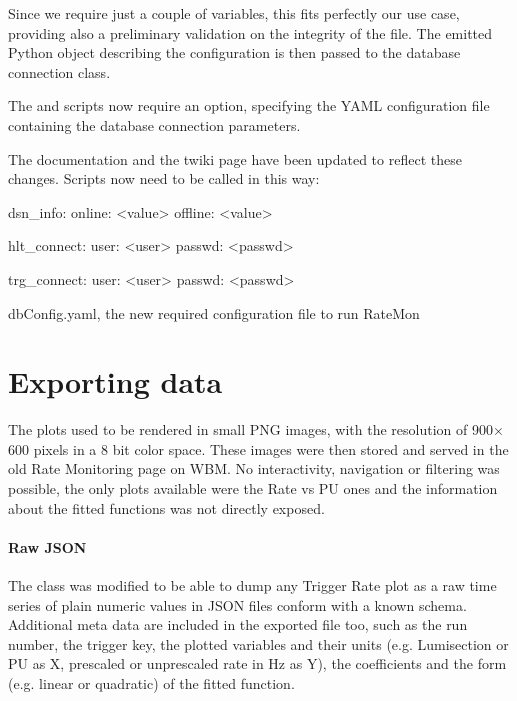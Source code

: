 Since we require just a couple of variables, this fits perfectly our use case, providing also a preliminary validation on the integrity of the file. The emitted Python object describing the configuration is then passed to the database connection class.

The  and  scripts now require an  option, specifying the YAML configuration file containing the database connection parameters.

The documentation and the twiki page have been updated to reflect these changes. Scripts now need to be called in this way:


\begin{listing}[ht]
\begin{yamlcode}
dsn_info:
    online: <value>
    offline: <value>

hlt_connect:
    user: <user>
    passwd: <passwd>

trg_connect:
    user: <user>
    passwd: <passwd>
\end{yamlcode}
\caption{dbConfig.yaml, the new required configuration file to run RateMon}
\end{listing}

\section{Exporting data}

The plots used to be rendered in small PNG images, with the resolution of 900$\times$600 pixels in a 8 bit color space. These images were then stored and served in the old Rate Monitoring page on WBM. No interactivity, navigation or filtering was possible, the only plots available were the Rate vs PU ones and the information about the fitted functions was not directly exposed.

\paragraph{Raw JSON}

The  class was modified \cite{RootexporttoggleJSONexportfunction6MergeRequestsCMSTSGFOGratemonGitLab-2020-10-07} to be able to dump any Trigger Rate plot as a raw time series of plain numeric values in JSON files conform with a known schema. Additional meta data are included in the exported file too, such as the run number, the trigger key, the plotted variables and their units (e.g. Lumisection or PU as X, prescaled or unprescaled rate in Hz as Y), the coefficients and the form (e.g. linear or quadratic) of the fitted function.

